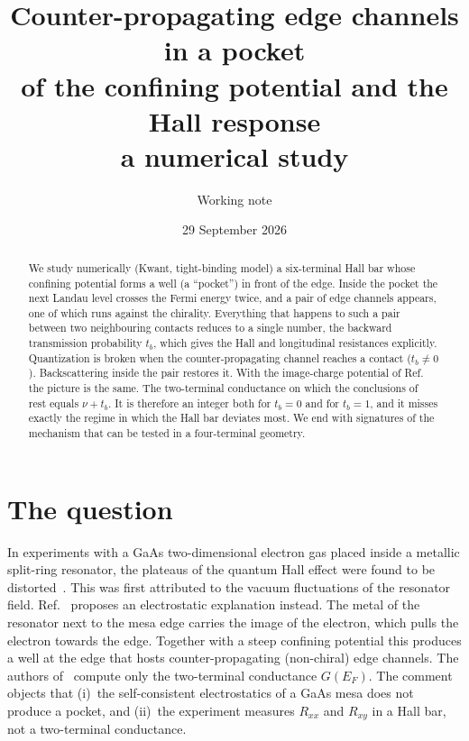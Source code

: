 \documentclass[11pt,a4paper]{article}
\title{Counter-propagating edge channels in a pocket\\ of the confining
potential and the Hall response\\[4pt]
\large a numerical study}
\author{Working note}
\date{29 September 2026}
\newcommand{\tb}{t_b}
\newcommand{\Rxy}{R_{xy}}
\newcommand{\Rxx}{R_{xx}}
\newcommand{\EF}{E_F}
\begin{document}
\maketitle

\begin{abstract}
\noindent
We study numerically (Kwant, tight-binding model) a six-terminal Hall bar
whose confining potential forms a well (a ``pocket'') in front of the edge.
Inside the pocket the next Landau level crosses the Fermi energy twice, and
a pair of edge channels appears, one of which runs against the chirality.
Everything that happens to such a pair between two neighbouring contacts
reduces to a single number, the backward transmission probability $\tb$,
which gives the Hall and longitudinal resistances explicitly. Quantization
is broken when the counter-propagating channel reaches a contact
($\tb\neq0$). Backscattering inside the pair restores it. With the
image-charge potential of Ref.~\cite{andolina} the picture is the same. The
two-terminal conductance on which the conclusions of~\cite{andolina} rest
equals $\nu+\tb$. It is therefore an integer both for $\tb=0$ and for
$\tb=1$, and it misses exactly the regime in which the Hall bar deviates
most. We end with signatures of the mechanism that can be tested in a
four-terminal geometry.
\end{abstract}

\tableofcontents

\section{The question}

In experiments with a GaAs two-dimensional electron gas placed inside a
metallic split-ring resonator, the plateaus of the quantum Hall effect were
found to be distorted~\cite{appugliese}. This was first attributed to the
vacuum fluctuations of the resonator field. Ref.~\cite{andolina} proposes an
electrostatic explanation instead. The metal of the resonator next to the
mesa edge carries the image of the electron, which pulls the electron
towards the edge. Together with a steep confining potential this produces a
well at the edge that hosts counter-propagating (non-chiral) edge channels.
The authors of~\cite{andolina} compute only the two-terminal conductance
$G(\EF)$. The comment~\cite{ciuti} objects that (i)~the self-consistent
electrostatics of a GaAs mesa does not produce a pocket, and (ii)~the
experiment measures $\Rxx$ and $\Rxy$ in a Hall bar, not a two-terminal
conductance.
\end{document}
